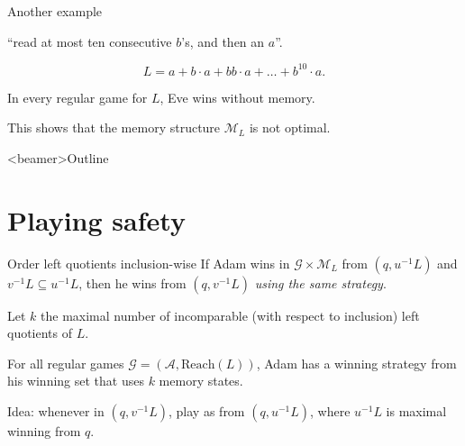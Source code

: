 \documentclass[svgnames]{beamer}
\newcommand{\Aa}{\mathcal{A}}
\newcommand{\Reach}{\mathrm{Reach}}
\newcommand{\M}{\mathcal{M}}
\newcommand{\G}{\mathcal{G}}
\begin{document}
\begin{frame}{Another example}

\begin{center}
``read at most ten consecutive $b$'s, and then an $a$''.
\end{center}
$$L = a + b\cdot a + bb\cdot a + \ldots + b^{10} \cdot a.$$

\pause
In every regular game for $L$, Eve wins without memory.

\pause
This shows that the memory structure $\M_L$ is not optimal.

\end{frame}

\begin{frame}<beamer>{Outline}
    \tableofcontents
\end{frame}

\section{Playing safety}

\begin{frame}{Order left quotients inclusion-wise}
If Adam wins in $\G \times \M_L$ from $(q,u^{-1} L)$ and $v^{-1} L \subseteq u^{-1} L$, 
then he wins from $(q,v^{-1} L)$ \pause \textit{using the same strategy}.

\pause
Let $k$ the maximal number of incomparable (with respect to inclusion) left quotients of $L$.

\pause

\begin{lemma}
For all regular games $\G = (\Aa,\Reach(L))$,
Adam has a winning strategy from his winning set that uses $k$ memory states.
\end{lemma}

\pause
Idea: whenever in $(q,v^{-1} L)$, play as from $(q,u^{-1} L)$, where $u^{-1} L$ is maximal
winning from $q$.
\end{frame}
\end{document}
